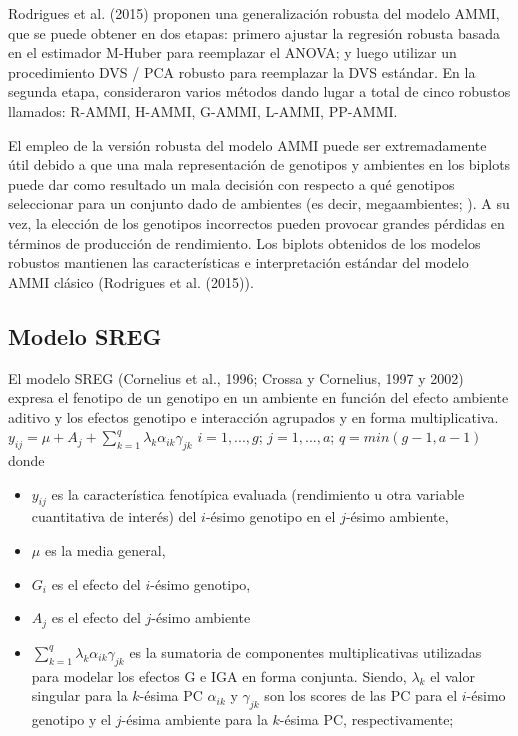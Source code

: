 Rodrigues et al. (2015) proponen una generalización robusta del modelo AMMI, que se puede obtener en dos etapas: primero ajustar la regresión robusta basada en el estimador M-Huber \citep{Huber1981} para reemplazar el ANOVA; y luego utilizar un procedimiento DVS / PCA robusto para reemplazar la DVS estándar. En la segunda etapa, consideraron varios métodos dando lugar a total de cinco robustos llamados: R-AMMI, H-AMMI, G-AMMI, L-AMMI, PP-AMMI. 

El empleo de la versión robusta del modelo AMMI puede ser extremadamente útil debido a que una mala representación de genotipos y ambientes en los biplots puede dar como resultado un mala decisión con respecto a qué genotipos seleccionar para un conjunto dado de ambientes (es decir, megaambientes; \citealp{Gauch1997,Yanetal2000}). A su vez, la elección de los genotipos incorrectos pueden provocar grandes pérdidas en términos de producción de rendimiento. Los biplots obtenidos de los modelos robustos mantienen las características e interpretación estándar del modelo AMMI clásico (Rodrigues et al. (2015)).

\subsection{Modelo SREG}

El modelo SREG (Cornelius et al., 1996; Crossa y Cornelius, 1997 y 2002) expresa el fenotipo de un genotipo en un ambiente en función del efecto ambiente aditivo y los efectos genotipo e interacción agrupados y en forma multiplicativa.
$y_{ij}= \mu +  A_j + \sum_{k=1}^q \lambda_k \alpha_{ik} \gamma_{jk}$ \hspace{0.5cm} $ i=1,...,g$;\hspace{0.15cm} $ j=1,...,a$; \hspace{0.15cm} $q=min(g-1,a-1)$
donde 
\begin{itemize}
\item $y_{ij}$ es la característica fenotípica evaluada (rendimiento u otra variable cuantitativa de interés) del $i$-ésimo genotipo en el $j$-ésimo ambiente,
\item $\mu$ es la media general,
\item  $G_i$ es el efecto del $i$-ésimo genotipo,
\item $A_j$ es el efecto del $j$-ésimo ambiente
\item $\sum_{k=1}^q \lambda_k \alpha_{ik} \gamma_{jk}$ es la sumatoria de componentes multiplicativas utilizadas para modelar los efectos G e IGA en forma conjunta. Siendo, $\lambda_k$ el valor singular para la  $k$-ésima PC $\alpha_{ik}$ y $\gamma_{jk}$ son los scores de las PC para el $i$-ésimo genotipo y el $j$-ésima ambiente para la $k$-ésima PC, respectivamente;
\end{itemize}


